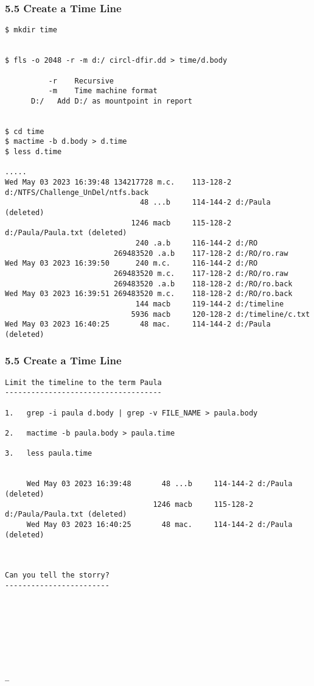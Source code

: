 \begin{frame}[fragile]
\frametitle{5.5 Create a Time Line}
  \begin{lstlisting}[basicstyle=\tiny]
$ mkdir time


$ fls -o 2048 -r -m d:/ circl-dfir.dd > time/d.body

          -r    Recursive
          -m    Time machine format
	  D:/   Add D:/ as mountpoint in report


$ cd time
$ mactime -b d.body > d.time
$ less d.time

.....
Wed May 03 2023 16:39:48 134217728 m.c.    113-128-2 d:/NTFS/Challenge_UnDel/ntfs.back
                               48 ...b     114-144-2 d:/Paula (deleted)
                             1246 macb     115-128-2 d:/Paula/Paula.txt (deleted)
                              240 .a.b     116-144-2 d:/RO
                         269483520 .a.b    117-128-2 d:/RO/ro.raw
Wed May 03 2023 16:39:50      240 m.c.     116-144-2 d:/RO
                         269483520 m.c.    117-128-2 d:/RO/ro.raw
                         269483520 .a.b    118-128-2 d:/RO/ro.back
Wed May 03 2023 16:39:51 269483520 m.c.    118-128-2 d:/RO/ro.back
                              144 macb     119-144-2 d:/timeline
                             5936 macb     120-128-2 d:/timeline/c.txt
Wed May 03 2023 16:40:25       48 mac.     114-144-2 d:/Paula (deleted)
  \end{lstlisting}
\end{frame}


\begin{frame}[fragile]
\frametitle{5.5 Create a Time Line}
  \begin{lstlisting}[basicstyle=\tiny]
Limit the timeline to the term Paula
------------------------------------

1.   grep -i paula d.body | grep -v FILE_NAME > paula.body

2.   mactime -b paula.body > paula.time

3.   less paula.time


     Wed May 03 2023 16:39:48       48 ...b     114-144-2 d:/Paula (deleted)
                                  1246 macb     115-128-2 d:/Paula/Paula.txt (deleted)
     Wed May 03 2023 16:40:25       48 mac.     114-144-2 d:/Paula (deleted)



Can you tell the storry?
------------------------








_
  \end{lstlisting}
\end{frame}


